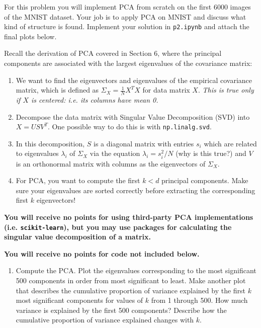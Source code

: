 \documentclass[submit]{harvardml}
\begin{document}
\begin{problem}

  
For this problem you will implement PCA from scratch on the first 6000 images of the MNIST dataset. Your job is to apply PCA on MNIST and discuss what kind of structure is found. Implement your solution in \texttt{p2.ipynb} and attach the final plots below.

Recall the derivation of PCA covered in Section 6, where the principal components are associated with the largest eigenvalues of the covariance matrix: 

\begin{enumerate}[label=(\alph*)]
    \item We want to find the eigenvectors and eigenvalues of the empirical covariance matrix, which is defined as $\Sigma_X = \frac{1}{N}X^TX$ for data matrix $X$. \textit{This is true only if $X$ is centered: i.e. its columns have mean 0.}
    \item Decompose the data matrix with Singular Value Decomposition (SVD) into $X = USV^T$. One possible way to do this is with {\normalfont \texttt{np.linalg.svd}}.
    \item In this decomposition, $S$ is a diagonal matrix with entries $s_{i}$ which are related to eigenvalues $\lambda_{i}$ of $\Sigma_X$ via the equation $\lambda_i = s_i^2/N$ (why is this true?) and $V$ is an orthonormal matrix with columns as the eigenvectors of $\Sigma_X$.
    \item For PCA, you want to compute the first $k < d$ principal components. Make sure your eigenvalues are sorted correctly before extracting the corresponding first $k$ eigenvectors!
\end{enumerate}

{\bfseries You will receive no points for using third-party PCA implementations (i.e. {\normalfont \texttt{scikit-learn}}), but you may use packages for calculating the singular value decomposition of a matrix.}

{\bfseries You will receive no points for code not included below.}
\begin{enumerate}

\item Compute the PCA. Plot the eigenvalues corresponding to the most
  significant 500 components in order from most significant to
  least. Make another plot that describes the cumulative proportion of
  variance explained by the first $k$ most significant components for
  values of $k$ from 1 through 500.  How much variance is explained by
  the first 500 components?  Describe how the cumulative proportion of
  variance explained changes with $k$. 
  

\end{enumerate}
\end{problem}
\end{document}
